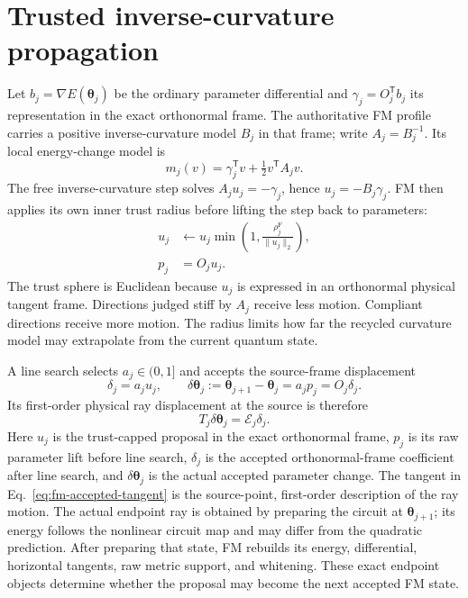 \documentclass[10pt,twocolumn]{article}
\begin{document}
\section*{Trusted inverse-curvature propagation}

Let \(b_j=\nabla E(\bm\theta_j)\) be the ordinary parameter differential and
\(\gamma_j=O_j^{\mathsf T}b_j\) its representation in the exact orthonormal
frame. The authoritative FM profile carries a positive inverse-curvature model
\(B_j\) in that frame; write \(A_j=B_j^{-1}\). Its local energy-change model
is
\begin{equation}
m_j(v)=\gamma_j^{\mathsf T}v
+\tfrac12v^{\mathsf T}A_jv.
\label{eq:fm-local-model}
\end{equation}
The free inverse-curvature step solves
\(A_ju_j=-\gamma_j\), hence \(u_j=-B_j\gamma_j\). FM then applies its own
inner trust radius before lifting the step back to parameters:
\begin{align}
u_j&\leftarrow u_j
\min\!\left(1,\frac{\rho_j^{\mathrm F}}{\|u_j\|_2}\right),\nonumber\\
p_j&=O_ju_j.
\label{eq:fm-proposal}
\end{align}
The trust sphere is Euclidean because \(u_j\) is expressed in an orthonormal
physical tangent frame. Directions judged stiff by \(A_j\) receive less
motion. Compliant directions receive more motion. The radius limits how far the
recycled curvature model may extrapolate from the current quantum state.

A line search selects \(a_j\in(0,1]\) and accepts the source-frame displacement
\begin{equation}
\delta_j=a_ju_j,
\qquad
\delta\bm\theta_j
:=\bm\theta_{j+1}-\bm\theta_j
=a_jp_j=O_j\delta_j.
\label{eq:fm-accepted-step}
\end{equation}
Its first-order physical ray displacement at the source is therefore
\begin{equation}
T_j\delta\bm\theta_j=\mathcal E_j\delta_j.
\label{eq:fm-accepted-tangent}
\end{equation}
Here \(u_j\) is the trust-capped proposal in the exact orthonormal frame,
\(p_j\) is its raw parameter lift before line search, \(\delta_j\) is the
accepted orthonormal-frame coefficient after line search, and
\(\delta\bm\theta_j\) is the actual accepted parameter change. The tangent in
Eq.~\eqref{eq:fm-accepted-tangent} is the source-point, first-order description
of the ray motion. The actual endpoint ray is obtained by preparing the circuit
at \(\bm\theta_{j+1}\); its energy follows the nonlinear circuit map and may
differ from the quadratic prediction. After preparing that state, FM rebuilds
its energy, differential, horizontal tangents, raw metric support, and
whitening. These exact endpoint
objects determine whether the proposal may become the next accepted FM state.
\end{document}
